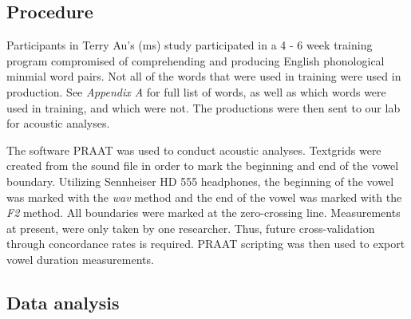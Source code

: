 \documentclass[man]{apa6}
\theoremstyle{definition}
\theoremstyle{definition}
\theoremstyle{definition}
\theoremstyle{remark}
\begin{document}
\subsection{Procedure}\label{procedure}

Participants in Terry Au's (ms) study participated in a 4 - 6 week
training program compromised of comprehending and producing English
phonological minmial word pairs. Not all of the words that were used in
training were used in production. See \emph{Appendix A} for full list of
words, as well as which words were used in training, and which were not.
The productions were then sent to our lab for acoustic analyses.

The software PRAAT was used to conduct acoustic analyses. Textgrids were
created from the sound file in order to mark the beginning and end of
the vowel boundary. Utilizing Sennheiser HD 555 headphones, the
beginning of the vowel was marked with the \emph{wav} method and the end
of the vowel was marked with the \emph{F2} method. All boundaries were
marked at the zero-crossing line. Measurements at present, were only
taken by one researcher. Thus, future cross-validation through
concordance rates is required. PRAAT scripting was then used to export
vowel duration measurements.

\subsection{Data analysis}\label{data-analysis}
\end{document}
